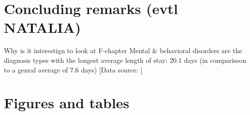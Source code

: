 \documentclass[11pt, a4paper,draft]{article} %
\begin{document}
\section{Concluding remarks (evtl NATALIA)}\label{sec:conclusion}

Why is it interestign to look at F-chapter
Mental \& behavioral disorders are the diagnosis types with the longest average length of stay: 20.1 days (in comparisson to a genral average of 7.6 days) [Data source: \cite[p. 5]{statistisches2012diagnosedaten} ]






\newpage






\newpage
\section{Figures and tables}

\end{document}
